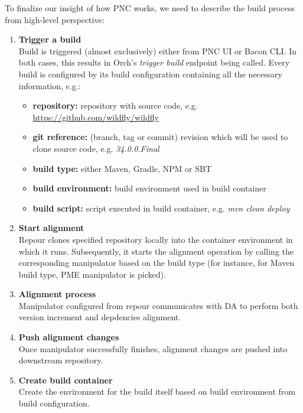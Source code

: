\documentclass[../main.tex]{subfiles}
\begin{document}
To finalize our insight of how PNC works, we need to describe the build process from high-level perspective:
\begin{enumerate}
    \item \textbf{Trigger a build}\\
    Build is triggered (almost exclusively) either from PNC UI or Bacon CLI. In both cases, this results in Orch's \textit{trigger build} endpoint being called. Every build is configured by its build configuration containing all the necessary information, e.g.:
    \begin{itemize}
        \item \textbf{repository:} repository with source code, e.g. \url{https://github.com/wildfly/wildfly}
        \item \textbf{git reference:} (branch, tag or commit) revision which will be used to clone source code, e.g. \textit{34.0.0.Final}
        \item \textbf{build type:} either Maven, Gradle, NPM or SBT
        \item \textbf{build environment:} build environment used in build container
        \item \textbf{build script:} script executed in build container, e.g. \textit{mvn clean deploy}
    \end{itemize}

    \item \textbf{Start alignment}\\
    Repour clones specified repository locally into the container environment in which it runs. Subsequently, it starts the alignment operation by calling the corresponding manipulator based on the build type (for instance, for Maven build type, PME manipulator is picked).

    \item \textbf{Alignment process}\\
    Manipulator configured from repour communicates with DA to perform both version increment and depdencies alignment.

    \item \textbf{Push alignment changes}\\
    Once manipulator successfully finishes, alignment changes are pushed into downstream repository.

    \item \textbf{Create build container}\\
    Create the environment for the build itself based on build environment from build configuration.


\end{enumerate}
\end{document}
